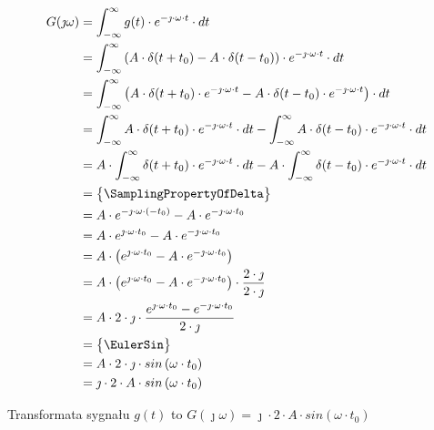 \begin{task}
\begin{align*}
G(\jmath \omega )&=\int_{-\infty }^{\infty}g(t) \cdot e^{-\jmath \cdot \omega \cdot t}\cdot dt\\
&=\int_{-\infty }^{\infty}\left( A \cdot \delta(t+t_0) - A \cdot \delta(t-t_0) \right) \cdot e^{-\jmath \cdot \omega \cdot t}\cdot dt\\
&=\int_{-\infty }^{\infty}\left( A \cdot \delta(t+t_0)\cdot e^{-\jmath \cdot \omega \cdot t} - A \cdot \delta(t-t_0)\cdot e^{-\jmath \cdot \omega \cdot t} \right) \cdot dt\\
&=\int_{-\infty }^{\infty} A \cdot \delta(t+t_0)\cdot e^{-\jmath \cdot \omega \cdot t}\cdot dt - \int_{-\infty }^{\infty} A \cdot \delta(t-t_0)\cdot e^{-\jmath \cdot \omega \cdot t} \cdot dt\\
&= A \cdot \int_{-\infty }^{\infty} \delta(t+t_0)\cdot e^{-\jmath \cdot \omega \cdot t}\cdot dt - A \cdot \int_{-\infty }^{\infty}  \delta(t-t_0)\cdot e^{-\jmath \cdot \omega \cdot t} \cdot dt\\
&=\begin{Bmatrix}
\SamplingPropertyOfDelta
\end{Bmatrix}\\
&= A \cdot e^{-\jmath \cdot \omega \cdot (-t_0)} - A \cdot e^{-\jmath \cdot \omega \cdot t_0}\\
&= A \cdot e^{\jmath \cdot \omega \cdot t_0} - A \cdot e^{-\jmath \cdot \omega \cdot t_0}\\
&= A \cdot \left(e^{\jmath \cdot \omega \cdot t_0} - A \cdot e^{-\jmath \cdot \omega \cdot t_0}\right)\\
&= A \cdot \left(e^{\jmath \cdot \omega \cdot t_0} - A \cdot e^{-\jmath \cdot \omega \cdot t_0}\right) \cdot \frac{2\cdot \jmath}{2\cdot \jmath}\\
&= A \cdot 2\cdot \jmath \cdot \frac{e^{\jmath \cdot \omega \cdot t_0} - e^{-\jmath \cdot \omega \cdot t_0}}{2\cdot \jmath}\\
&=\begin{Bmatrix}
\EulerSin
\end{Bmatrix}\\
&= A \cdot 2\cdot \jmath \cdot sin\left( \omega \cdot t_0\right)\\
&= \jmath \cdot 2 \cdot A \cdot sin\left( \omega \cdot t_0\right)\\
\end{align*}

Transformata sygnału $g(t)$ to $G(\jmath \omega)=\jmath \cdot 2 \cdot A \cdot sin\left( \omega \cdot t_0\right)$
\\


\end{task}
